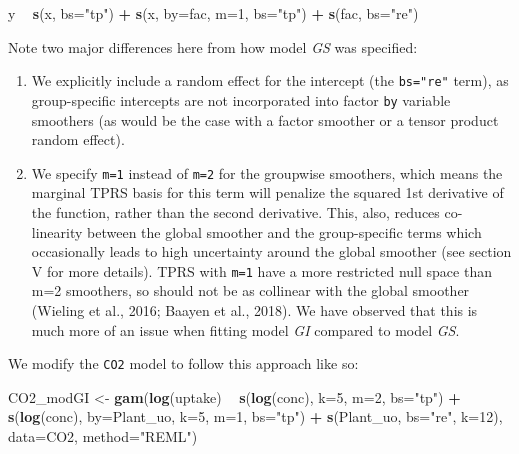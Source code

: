 \documentclass[12pt]{article}
\newenvironment{Shaded}{\begin{snugshade}}{\end{snugshade}}
\newcommand{\KeywordTok}[1]{\textcolor[rgb]{0.13,0.29,0.53}{\textbf{#1}}}
\newcommand{\DataTypeTok}[1]{\textcolor[rgb]{0.13,0.29,0.53}{#1}}
\newcommand{\DecValTok}[1]{\textcolor[rgb]{0.00,0.00,0.81}{#1}}
\newcommand{\StringTok}[1]{\textcolor[rgb]{0.31,0.60,0.02}{#1}}
\newcommand{\OperatorTok}[1]{\textcolor[rgb]{0.81,0.36,0.00}{\textbf{#1}}}
\newcommand{\NormalTok}[1]{#1}
\providecommand{\tightlist}{%
  \setlength{\itemsep}{0pt}\setlength{\parskip}{0pt}}
\begin{document}
\begin{Shaded}
\begin{Highlighting}[]
\NormalTok{y }\OperatorTok{~}\StringTok{ }\KeywordTok{s}\NormalTok{(x, }\DataTypeTok{bs=}\StringTok{"tp"}\NormalTok{) }\OperatorTok{+}\StringTok{ }\KeywordTok{s}\NormalTok{(x, }\DataTypeTok{by=}\NormalTok{fac, }\DataTypeTok{m=}\DecValTok{1}\NormalTok{, }\DataTypeTok{bs=}\StringTok{"tp"}\NormalTok{) }\OperatorTok{+}\StringTok{ }\KeywordTok{s}\NormalTok{(fac, }\DataTypeTok{bs=}\StringTok{"re"}\NormalTok{)}
\end{Highlighting}
\end{Shaded}

Note two major differences here from how model \emph{GS} was specified:

\begin{enumerate}
\def\labelenumi{\arabic{enumi}.}
\tightlist
\item
  We explicitly include a random effect for the intercept (the
  \texttt{bs="re"} term), as group-specific intercepts are not
  incorporated into factor \texttt{by} variable smoothers (as would be
  the case with a factor smoother or a tensor product random effect).
\item
  We specify \texttt{m=1} instead of \texttt{m=2} for the groupwise
  smoothers, which means the marginal TPRS basis for this term will
  penalize the squared 1st derivative of the function, rather than the
  second derivative. This, also, reduces co-linearity between the global
  smoother and the group-specific terms which occasionally leads to high
  uncertainty around the global smoother (see section V for more
  details). TPRS with \texttt{m=1} have a more restricted null space
  than m=2 smoothers, so should not be as collinear with the global
  smoother (Wieling et al., 2016; Baayen et al., 2018). We have observed
  that this is much more of an issue when fitting model \emph{GI}
  compared to model \emph{GS}.
\end{enumerate}

We modify the \texttt{CO2} model to follow this approach like so:

\begin{Shaded}
\begin{Highlighting}[]
\NormalTok{CO2_modGI <-}\StringTok{ }\KeywordTok{gam}\NormalTok{(}\KeywordTok{log}\NormalTok{(uptake) }\OperatorTok{~}\StringTok{ }\KeywordTok{s}\NormalTok{(}\KeywordTok{log}\NormalTok{(conc), }\DataTypeTok{k=}\DecValTok{5}\NormalTok{, }\DataTypeTok{m=}\DecValTok{2}\NormalTok{, }\DataTypeTok{bs=}\StringTok{"tp"}\NormalTok{) }\OperatorTok{+}
\StringTok{                  }\KeywordTok{s}\NormalTok{(}\KeywordTok{log}\NormalTok{(conc), }\DataTypeTok{by=}\NormalTok{Plant_uo, }\DataTypeTok{k=}\DecValTok{5}\NormalTok{, }\DataTypeTok{m=}\DecValTok{1}\NormalTok{, }\DataTypeTok{bs=}\StringTok{"tp"}\NormalTok{) }\OperatorTok{+}
\StringTok{                  }\KeywordTok{s}\NormalTok{(Plant_uo, }\DataTypeTok{bs=}\StringTok{"re"}\NormalTok{, }\DataTypeTok{k=}\DecValTok{12}\NormalTok{),}
                \DataTypeTok{data=}\NormalTok{CO2, }\DataTypeTok{method=}\StringTok{"REML"}\NormalTok{)}
\end{Highlighting}
\end{Shaded}
\end{document}
